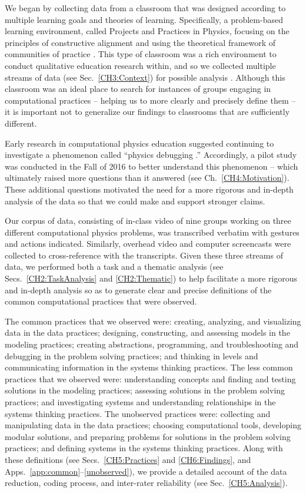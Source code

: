 \documentclass{msuphddissertation}
\begin{document}
\begin{doublespace}
We began by collecting data from a classroom that was designed according to multiple learning goals and theories of learning.  Specifically, a problem-based learning environment, called Projects and Practices in Physics, focusing on the principles of constructive alignment and using the theoretical framework of communities of practice \cite{Irving2017}.  This type of classroom was a rich environment to conduct qualitative education research within, and so we collected multiple streams of data (see Sec.~\ref{CH3:Context}) for possible analysis \cite{Hawkins2017,Pawlak2018}.  Although this classroom was an ideal place to search for instances of groups engaging in computational practices -- helping us to more clearly and precisely define them -- it is important not to generalize our findings to classrooms that are sufficiently different.

Early research in computational physics education suggested continuing to investigate a phenomenon called ``physics debugging \cite{Caballero2011}.''  Accordingly, a pilot study was conducted in the Fall of 2016 to better understand this phenomenon -- which ultimately raised more questions than it answered (see Ch.~\ref{CH4:Motivation}).  These additional questions motivated the need for a more rigorous and in-depth analysis of the data so that we could make and support stronger claims.

Our corpus of data, consisting of in-class video of nine groups working on three different computational physics problems, was transcribed verbatim with gestures and actions indicated.  Similarly, overhead video and computer screencasts were collected to cross-reference with the transcripts.  Given these three streams of data, we performed both a task and a thematic analysis (see Secs.~\ref{CH2:TaskAnalysis} and \ref{CH2:Thematic}) to help facilitate a more rigorous and in-depth analysis so as to generate clear and precise definitions of the common computational practices that were observed.

The common practices that we observed were: creating, analyzing, and visualizing data in the data practices; designing, constructing, and assessing models in the modeling practices; creating abstractions, programming, and troubleshooting and debugging in the problem solving practices; and thinking in levels and communicating information in the systems thinking practices.  The less common practices that we observed were: understanding concepts and finding and testing solutions in the modeling practices; assessing solutions in the problem solving practices; and investigating systems and understanding relationships in the systems thinking practices.  The unobserved practices were: collecting and manipulating data in the data practices; choosing computational tools, developing modular solutions, and preparing problems for solutions in the problem solving practices; and defining systems in the systems thinking practices.  Along with these definitions (see Secs.~\ref{CH5:Practices} and \ref{CH6:Findings}, and Apps.~\ref{app:common}--\ref{unobserved}), we provide a detailed account of the data reduction, coding process, and inter-rater reliability (see Sec.~\ref{CH5:Analysis}).


\end{doublespace}
\end{document}
